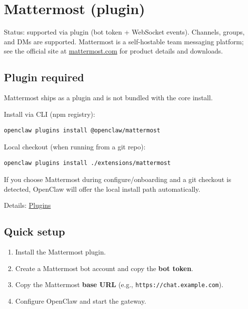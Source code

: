 


\clearpage

\section{Mattermost (plugin)}


Status: supported via plugin (bot token + WebSocket events). Channels, groups, and DMs are supported.
Mattermost is a self-hostable team messaging platform; see the official site at
\href{https://mattermost.com}{mattermost.com} for product details and downloads.

\subsection{Plugin required}


Mattermost ships as a plugin and is not bundled with the core install.

Install via CLI (npm registry):

\begin{lstlisting}[language=bash]
openclaw plugins install @openclaw/mattermost
\end{lstlisting}


Local checkout (when running from a git repo):

\begin{lstlisting}[language=bash]
openclaw plugins install ./extensions/mattermost
\end{lstlisting}


If you choose Mattermost during configure/onboarding and a git checkout is detected,
OpenClaw will offer the local install path automatically.

Details: \href{/tools/plugin}{Plugins}

\subsection{Quick setup}


\begin{enumerate}
  \item Install the Mattermost plugin.
  \item Create a Mattermost bot account and copy the \textbf{bot token}.
  \item Copy the Mattermost \textbf{base URL} (e.g., \texttt{https://chat.example.com}).
  \item Configure OpenClaw and start the gateway.
\end{enumerate}


